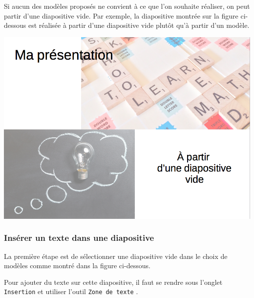 \begin{minipage}[c]{.58\textwidth}
Si aucun des modèles proposés ne convient à ce que l'on souhaite réaliser, on peut partir d'une diapositive vide. Par exemple, la diapositive montrée sur la figure ci-dessous est réalisée à partir d'une diapositive vide plutôt qu'à partir d'un modèle.

\centering%
\includegraphics[angle=0,width=.75\textwidth]{./images/presentation/Impress_07DiaSansFormat_10}


\end{minipage}\hfill%

\subsubsection{Insérer un texte dans une diapositive}\label{Presentation1texte}


\vspace{1em}

La première étape est de sélectionner une diapositive vide dans le choix de modèles comme montré dans la figure ci-dessous.




Pour ajouter du texte sur cette diapositive, il faut se rendre sous l'onglet \texttt{Insertion}  et utiliser l'outil \texttt{Zone de texte} .


